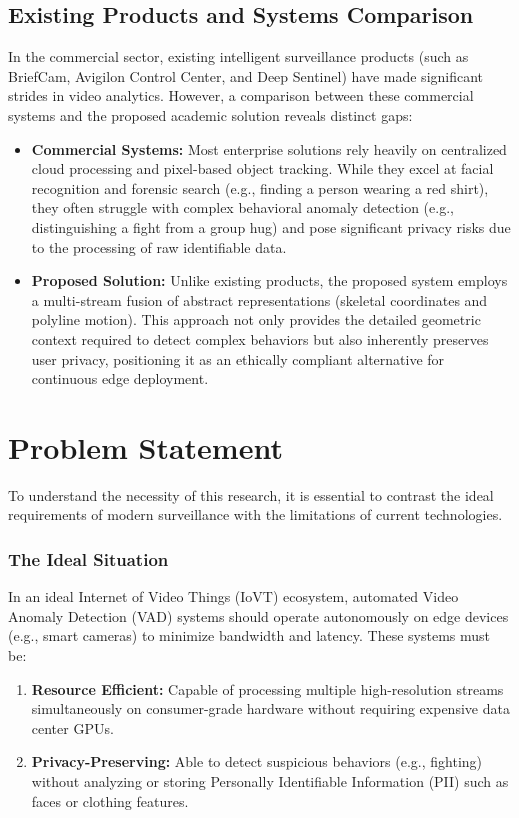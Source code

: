 \documentclass[12pt]{article}
\begin{document}
\subsection{Existing Products and Systems Comparison}
In the commercial sector, existing intelligent surveillance products (such as BriefCam, Avigilon Control Center, and Deep Sentinel) have made significant strides in video analytics. However, a comparison between these commercial systems and the proposed academic solution reveals distinct gaps:
\begin{itemize}
    \item \textbf{Commercial Systems:} Most enterprise solutions rely heavily on centralized cloud processing and pixel-based object tracking. While they excel at facial recognition and forensic search (e.g., finding a person wearing a red shirt), they often struggle with complex behavioral anomaly detection (e.g., distinguishing a fight from a group hug) and pose significant privacy risks due to the processing of raw identifiable data.
    \item \textbf{Proposed Solution:} Unlike existing products, the proposed system employs a multi-stream fusion of abstract representations (skeletal coordinates and polyline motion). This approach not only provides the detailed geometric context required to detect complex behaviors but also inherently preserves user privacy, positioning it as an ethically compliant alternative for continuous edge deployment.
\end{itemize}

\clearpage


\section{Problem Statement}
To understand the necessity of this research, it is essential to contrast the ideal requirements of modern surveillance with the limitations of current technologies.

\subsubsection{The Ideal Situation}
In an ideal Internet of Video Things (IoVT) ecosystem, automated Video Anomaly Detection (VAD) systems should operate autonomously on edge devices (e.g., smart cameras) to minimize bandwidth and latency. These systems must be:
\begin{enumerate}
    \item \textbf{Resource Efficient:} Capable of processing multiple high-resolution streams simultaneously on consumer-grade hardware without requiring expensive data center GPUs.
    \item \textbf{Privacy-Preserving:} Able to detect suspicious behaviors (e.g., fighting) without analyzing or storing Personally Identifiable Information (PII) such as faces or clothing features.
\end{enumerate}
\end{document}
